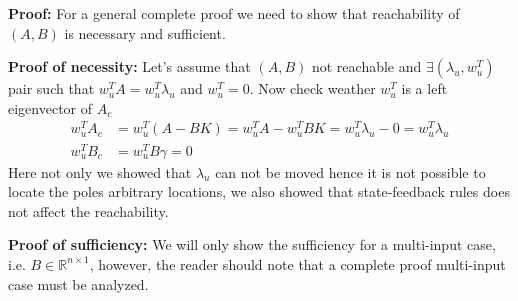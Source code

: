 \documentclass[twoside]{article}
\begin{document}
\textbf{Proof:} For a general complete proof we need to show that reachability of $(A,B)$ is necessary and sufficient. 

\textbf{Proof of necessity: } Let's assume that $(A,B)$ not reachable and $\exists (\lambda_u , w_u^T)$ pair such that
$w_u^T A = w_u^T \lambda_u $ and $w_u^T = 0$. Now check weather $w_u^T$ is a left eigenvector of $A_c$
%
\begin{align*}
	w_u^T A_c &= w_u^T (A - B K ) = w_u^T A - w_u^T B K = w_u^T \lambda_u - 0 = w_u^T \lambda_u
	\\
	w_u^T B_c &= w_u^T B \gamma = 0
\end{align*} 
%
Here not only we showed that $\lambda_u$ can not be moved hence it is not possible to locate the poles
arbitrary locations, we also showed that state-feedback rules does not affect the reachability.

\textbf{Proof of sufficiency:} We will only show the sufficiency for a multi-input case, i.e. $B \in \mathbb{R}^{n \times 1}$, 
however, the reader should note that a complete proof multi-input case must be analyzed. 
\end{document}

